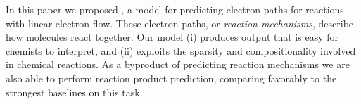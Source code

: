 
In this paper we proposed \ourModel, a model for predicting electron paths for reactions with linear electron flow.
These electron paths, or {\em reaction mechanisms}, describe how molecules react together. 
Our model (i) produces output that is easy for chemists to interpret, and (ii) exploits the sparsity and compositionality involved in chemical reactions.
As a byproduct of predicting reaction mechanisms we are also able to perform reaction product prediction,
comparing favorably to the strongest baselines on this task. 
%


